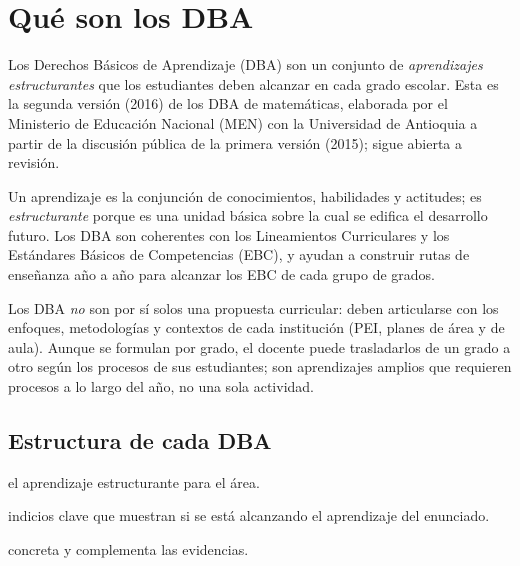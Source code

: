 \section{Qué son los DBA}\label{sec:intro}

Los Derechos Básicos de Aprendizaje (DBA) son un conjunto de \emph{aprendizajes
estructurantes} que los estudiantes deben alcanzar en cada grado escolar. Esta es la
segunda versión (2016) de los DBA de matemáticas, elaborada por el Ministerio de Educación
Nacional (MEN) con la Universidad de Antioquia a partir de la discusión pública de la
primera versión (2015); sigue abierta a revisión.


Un aprendizaje es la conjunción de conocimientos, habilidades y actitudes; es
\emph{estructurante} porque es una unidad básica sobre la cual se edifica el desarrollo
futuro. Los DBA son coherentes con los Lineamientos Curriculares y los Estándares Básicos
de Competencias (EBC), y ayudan a construir rutas de enseñanza año a año para alcanzar los
EBC de cada grupo de grados.

Los DBA \emph{no} son por sí solos una propuesta curricular: deben articularse con los
enfoques, metodologías y contextos de cada institución (PEI, planes de área y de aula).
Aunque se formulan por grado, el docente puede trasladarlos de un grado a otro según los
procesos de sus estudiantes; son aprendizajes amplios que requieren procesos a lo largo
del año, no una sola actividad.

\subsection*{Estructura de cada DBA}
\begin{description}[nosep]
  \item[Enunciado] el aprendizaje estructurante para el área.
  \item[Evidencias de aprendizaje] indicios clave que muestran si se está alcanzando el
    aprendizaje del enunciado.
  \item[Ejemplo] concreta y complementa las evidencias.
\end{description}

